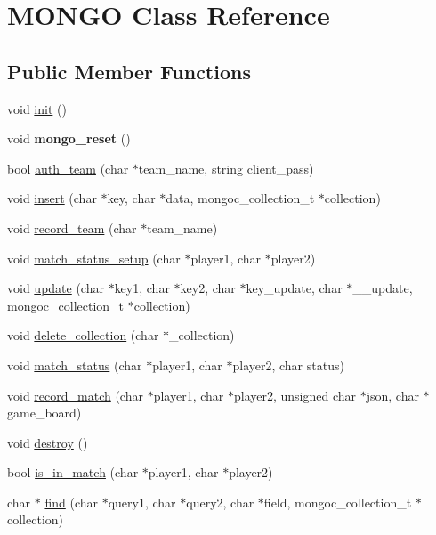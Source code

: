 \hypertarget{classMONGO}{\section{M\+O\+N\+G\+O Class Reference}
\label{classMONGO}
}
\subsection*{Public Member Functions}
\begin{DoxyCompactItemize}
\item 
void \hyperlink{classMONGO_a9438bf5a9812cb46554dfbd7f341992f}{init} ()
\item 
\hypertarget{classMONGO_a5ea45e9188197bbe88956b1c19a24184}{void {\bfseries mongo\+\_\+reset} ()}\label{classMONGO_a5ea45e9188197bbe88956b1c19a24184}

\item 
bool \hyperlink{classMONGO_a463df4a5a95c1b6a2f8c2e71b94828d5}{auth\+\_\+team} (char $\ast$team\+\_\+name, string client\+\_\+pass)
\item 
void \hyperlink{classMONGO_a0992cdb06d5e843c45e283f8fdd4e514}{insert} (char $\ast$key, char $\ast$data, mongoc\+\_\+collection\+\_\+t $\ast$collection)
\item 
void \hyperlink{classMONGO_af80b67e1b026c78e5c105bd09c88e47a}{record\+\_\+team} (char $\ast$team\+\_\+name)
\item 
void \hyperlink{classMONGO_ac8b5b4d27ff45f171af831436c2eb9cb}{match\+\_\+status\+\_\+setup} (char $\ast$player1, char $\ast$player2)
\item 
void \hyperlink{classMONGO_a8d7eac5d5d239cc4e8c52edfee20ca4a}{update} (char $\ast$key1, char $\ast$key2, char $\ast$key\+\_\+update, char $\ast$\+\_\+\+\_\+update, mongoc\+\_\+collection\+\_\+t $\ast$collection)
\item 
void \hyperlink{classMONGO_a2dd95231d18411af37289da2b85dd824}{delete\+\_\+collection} (char $\ast$\+\_\+collection)
\item 
void \hyperlink{classMONGO_a602231cc070da56955556fd93d3381f7}{match\+\_\+status} (char $\ast$player1, char $\ast$player2, char status)
\item 
void \hyperlink{classMONGO_a8ade973ce7a97d558b4f97c89ac861a3}{record\+\_\+match} (char $\ast$player1, char $\ast$player2, unsigned char $\ast$json, char $\ast$game\+\_\+board)
\item 
void \hyperlink{classMONGO_aff2b851fb8f080cc76327a256a482143}{destroy} ()
\item 
bool \hyperlink{classMONGO_a14de376ed461fef70d59a1874a43cc1c}{is\+\_\+in\+\_\+match} (char $\ast$player1, char $\ast$player2)
\item 
char $\ast$ \hyperlink{classMONGO_a73aeca685c913675727892f3e8ea7716}{find} (char $\ast$query1, char $\ast$query2, char $\ast$field, mongoc\+\_\+collection\+\_\+t $\ast$collection)
\end{DoxyCompactItemize}


